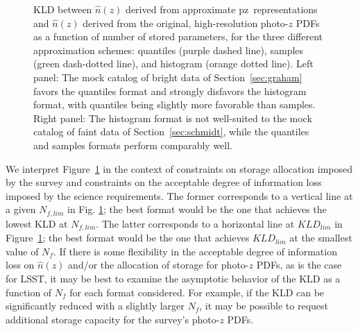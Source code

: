 \documentclass[\docopts]{\docclass}
\newcommand{\pz}{photo-$z$ PDF}
\newcommand{\mgdata}{bright\xspace}
\newcommand{\ssdata}{faint\xspace}
\begin{document}
\begin{figure}
\begin{center}
    \caption{KLD between $\hat{n}(z)$ derived from approximate pz\ 
representations and  $\hat{n}(z)$ derived from the original, high-resolution 
\pz s as a function of number of stored parameters, for the three different 
approximation schemes: quantiles (purple dashed line), samples (green 
dash-dotted line), and histogram (orange dotted line).
    Left panel: The mock catalog of \mgdata data of Section~\ref{sec:graham} 
favors the quantiles format and strongly disfavors the histogram format, with 
quantiles being slightly more favorable than samples.
    Right panel: The histogram format is not well-suited to the mock catalog of 
\ssdata data of Section~\ref{sec:schmidt}, while the quantiles and samples 
formats perform comparably well.
    \label{fig:kld}}
  \end{center}
\end{figure}

We interpret Figure~\ref{fig:kld} in the context of constraints on storage 
allocation imposed by the survey and constraints on the acceptable degree of 
information loss imposed by the science requirements.
The former corresponds to a vertical line at a given $N_{f, lim}$ in Fig. 
\ref{fig:kld}; the best format would be the one that achieves the lowest KLD at 
$N_{f, lim}$.
The latter corresponds to a horizontal line at $KLD_{lim}$ in 
Figure~\ref{fig:kld}; the best format would be the one that achieves 
$KLD_{lim}$ at the smallest value of $N_{f}$.
If there is some flexibility in the acceptable degree of information loss on 
$\hat{n}(z)$ and/or the allocation of storage for \pz s, as is the case for 
LSST, it may be best to examine the asymptotic behavior of the KLD as a 
function of $N_{f}$ for each format considered.
For example, if the KLD can be significantly reduced with a slightly larger 
$N_{f}$, it may be possible to request additional storage capacity for the 
survey's \pz s.
\end{document}

